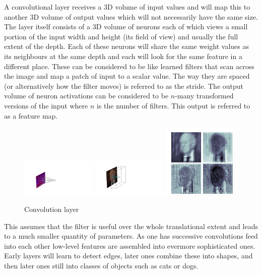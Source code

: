 A convolutional layer receives a 3D volume of input values and will map this to another 3D volume of output values which will not necessarily have the same size. 
The layer itself consists of a 3D volume of neurons each of which views a small portion of the input width and height (its field of view) and usually the full extent of the depth. 
Each of these neurons will share the same weight values as its neighbours at the same depth and each will look for the same feature in a different place. 
These can be considered to be like learned filters that scan across the image and map a patch of input to a scalar value. The way they are spaced (or alternatively how the filter moves) is referred to as the stride. 
The output volume of neuron activations can be considered to be $n$-many transformed versions of the input where $n$ is the number of filters. This output is referred to as a feature map. 
\begin{figure}[h!]
    \begin{center}
        \includegraphics[width=0.32\textwidth]{figures/machine_learning/convolution_neuron.pdf}
        \includegraphics[width=0.32\textwidth]{figures/machine_learning/convolution_layer.pdf}
        \includegraphics[width=0.32\textwidth]{figures/machine_learning/convolution_transforms.pdf}
    \end{center}
    \caption{Convolution layer}
        \label{fig:machine_learning:convolution}
\end{figure}

This assumes that the filter is useful over the whole translational extent and leads to a much smaller quantity of parameters. As one has successive convolutions feed into each other low-level features are assembled into evermore sophisticated ones. Early layers will learn to detect edges, later ones combine these into shapes, and then later ones still into classes of objects such as cats or dogs. 


